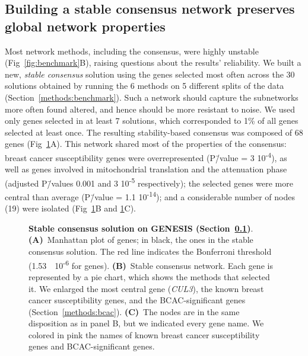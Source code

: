\documentclass[10pt,letterpaper]{article}
\begin{document}
\subsection{Building a stable consensus network preserves global network properties}
\label{results:stable-consensus}

Most network methods, including the consensus, were highly unstable (Fig~\ref{fig:benchmark}B), raising questions about the results' reliability. We built a new, \emph{stable consensus} solution using the genes selected most often across the 30 solutions obtained by running the 6 methods on 5 different splits of the data (Section~\ref{methods:benchmark}). Such a network should capture the subnetworks more often found altered, and hence should be more resistant to noise. We used only genes selected in at least 7 solutions, which corresponded to 1\% of all genes selected at least once. The resulting stability-based consensus was composed of 68 genes (Fig~\ref{fig:stable-consensus}A). This network shared most of the properties of the consensus: breast cancer susceptibility genes were overrepresented (P\=/value = 3 \texttimes{} 10\textsuperscript{-4}), as well as genes involved in mitochondrial translation and the attenuation phase (adjusted P\=/values 0.001 and 3 \texttimes{} 10\textsuperscript{-5} respectively); the selected genes were more central than average (P\=/value = 1.1 \texttimes{} 10\textsuperscript{-14}); and a considerable number of nodes (19) were isolated (Fig~\ref{fig:stable-consensus}B and \ref{fig:stable-consensus}C).

\begin{figure}[!ht]
  \centering
  \caption{ \textbf{Stable consensus solution on GENESIS (Section~\ref{results:stable-consensus})}. \textbf{(A)}~Manhattan plot of genes; in black, the ones in the stable consensus solution. The red line indicates the Bonferroni threshold (1.53~\texttimes{}~10\textsuperscript{-6} for genes). \textbf{(B)}~Stable consensus network. Each gene is represented by a pie chart, which shows the methods that selected it. We enlarged the most central gene (\emph{CUL3}), the known breast cancer susceptibility genes, and the BCAC-significant genes (Section~\ref{methods:bcac}). \textbf{(C)}~The nodes are in the same disposition as in panel B, but we indicated every gene name. We colored in pink the names of known breast cancer susceptibility genes and BCAC-significant genes.}
  \label{fig:stable-consensus}
  \end{figure}
\end{document}
